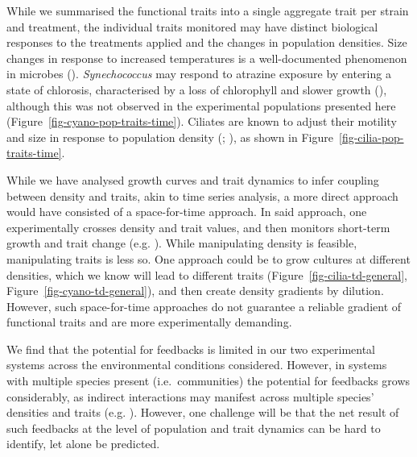 \documentclass[
  letterpaper,
  DIV=11,
  numbers=noendperiod]{scrartcl}
\begin{document}
While we summarised the functional traits into a single aggregate trait
per strain and treatment, the individual traits monitored may have
distinct biological responses to the treatments applied and the changes
in population densities. Size changes in response to increased
temperatures is a well-documented phenomenon in microbes
(). \emph{Synechococcus}
may respond to atrazine exposure by entering a state of chlorosis,
characterised by a loss of chlorophyll and slower growth
(),
although this was not observed in the experimental populations presented
here (Figure~\ref{fig-cyano-pop-traits-time}). Ciliates are known to
adjust their motility and size in response to population density
(;
), as shown in
Figure~\ref{fig-cilia-pop-traits-time}.

While we have analysed growth curves and trait dynamics to infer
coupling between density and traits, akin to time series analysis, a
more direct approach would have consisted of a space-for-time approach.
In said approach, one experimentally crosses density and trait values,
and then monitors short-term growth and trait change (e.g.
). While
manipulating density is feasible, manipulating traits is less so. One
approach could be to grow cultures at different densities, which we know
will lead to different traits (Figure~\ref{fig-cilia-td-general},
Figure~\ref{fig-cyano-td-general}), and then create density gradients by
dilution. However, such space-for-time approaches do not guarantee a
reliable gradient of functional traits and are more experimentally
demanding.

We find that the potential for feedbacks is limited in our two
experimental systems across the environmental conditions considered.
However, in systems with multiple species present (i.e.~communities) the
potential for feedbacks grows considerably, as indirect interactions may
manifest across multiple species' densities and traits (e.g.
). However, one challenge
will be that the net result of such feedbacks at the level of population
and trait dynamics can be hard to identify, let alone be predicted.
\end{document}
